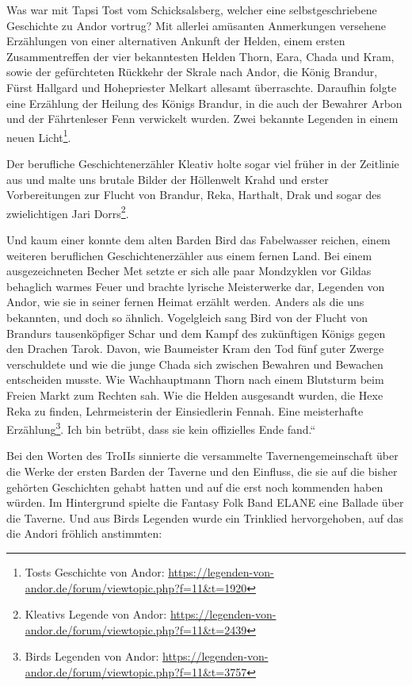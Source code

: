Was war mit Tapsi Tost vom Schicksalsberg, welcher eine selbstgeschriebene Geschichte zu Andor vortrug? Mit allerlei amüsanten Anmerkungen versehene Erzählungen von einer alternativen Ankunft der Helden, einem ersten Zusammentreffen der vier bekanntesten Helden Thorn, Eara, Chada und Kram, sowie der gefürchteten Rückkehr der Skrale nach Andor, die König Brandur, Fürst Hallgard und Hohepriester Melkart allesamt überraschte. Daraufhin folgte eine Erzählung der Heilung des Königs Brandur, in die auch der Bewahrer Arbon und der Fährtenleser Fenn verwickelt wurden. Zwei bekannte Legenden in einem neuen Licht\footnote{Tosts Geschichte von Andor: \url{https://legenden-von-andor.de/forum/viewtopic.php?f=11&t=1920}}.

Der berufliche Geschichtenerzähler Kleativ holte sogar viel früher in der Zeitlinie aus und malte uns brutale Bilder der Höllenwelt Krahd und erster Vorbereitungen zur Flucht von Brandur, Reka, Harthalt, Drak und sogar des zwielichtigen Jari Dorrs\footnote{Kleativs Legende von Andor: \url{https://legenden-von-andor.de/forum/viewtopic.php?f=11&t=2439}}.

Und kaum einer konnte dem alten Barden Bird das Fabelwasser reichen, einem weiteren beruflichen Geschichtenerzähler aus einem fernen Land. Bei einem ausgezeichneten Becher Met setzte er sich alle paar Mondzyklen vor Gildas behaglich warmes Feuer und brachte lyrische Meisterwerke dar, Legenden von Andor, wie sie in seiner fernen Heimat erzählt werden. Anders als die uns bekannten, und doch so ähnlich. Vogelgleich sang Bird von der Flucht von Brandurs tausenköpfiger Schar und dem Kampf des zukünftigen Königs gegen den Drachen Tarok. Davon, wie Baumeister Kram den Tod fünf guter Zwerge verschuldete und wie die junge Chada sich zwischen Bewahren und Bewachen entscheiden musste. Wie Wachhauptmann Thorn nach einem Blutsturm beim Freien Markt zum Rechten sah. Wie die Helden ausgesandt wurden, die Hexe Reka zu finden, Lehrmeisterin der Einsiedlerin Fennah. Eine meisterhafte Erzählung\footnote{Birds Legenden von Andor: \url{https://legenden-von-andor.de/forum/viewtopic.php?f=11&t=3757}}. Ich bin betrübt, dass sie kein offizielles Ende fand.“

Bei den Worten des TroIIs sinnierte die versammelte Tavernengemeinschaft über die Werke der ersten Barden der Taverne und den Einfluss, die sie auf die bisher gehörten Geschichten gehabt hatten und auf die erst noch kommenden haben würden. Im Hintergrund spielte die Fantasy Folk Band ELANE eine Ballade über die Taverne. Und aus Birds Legenden wurde ein Trinklied hervorgehoben, auf das die Andori fröhlich anstimmten:

